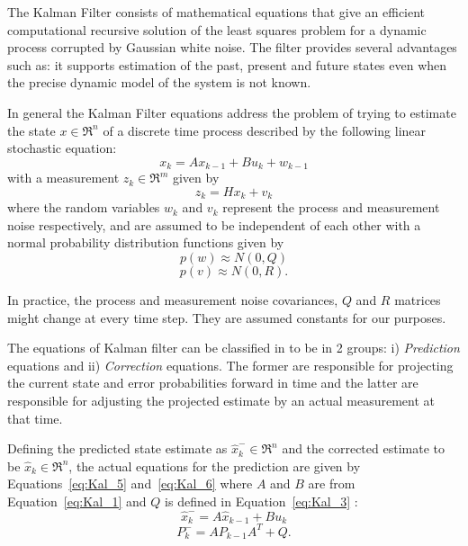 The Kalman Filter \cite{Kalman1960, WelchandBishop1995} consists of mathematical equations that give an efficient computational recursive solution of the least squares problem for a dynamic process corrupted by Gaussian white noise. The filter provides several advantages such as: it supports estimation of the past, present and future states even when the precise dynamic model of the system is not known.

In general the Kalman Filter equations address the problem of trying to estimate the state $ x \in \Re^n $ of a discrete time process described by the following linear stochastic equation:
\begin{equation}
\label{eq:Kal_1}
x_k = Ax_{k-1} + Bu_k + w_{k-1}
\end{equation}
with a measurement $ z_k \in \Re^m $ given by
\begin{equation}
\label{eq:Kal_2}
z_k=Hx_k+v_k
\end{equation}
where the random variables $ w_k $ and $ v_k$ represent the process and measurement noise respectively, and are assumed to be independent of each other with a normal probability distribution functions given by
\begin{equation}
\label{eq:Kal_3}
p(w)\approx N(0,Q)
\end{equation} 
\begin{equation}
\label{eq:Kal_4}
p(v) \approx N(0,R).
\end{equation}

In practice, the process and measurement noise covariances, $ Q $ and $ R $ matrices might change at every time step. They are assumed constants for our purposes. 

The equations of Kalman filter can be classified in to be in 2 groups: i) \textit{Prediction} equations and ii) \textit{Correction} equations. The former are responsible for projecting the current state and error probabilities forward in time and the latter are responsible for adjusting the projected estimate by an actual measurement at that time. 

Defining the predicted state estimate as $ \hat{x}^-_k \in \Re^n $ and the corrected estimate to be $ \hat{x}_k \in \Re^n $, the actual equations for the prediction are given by Equations~\ref{eq:Kal_5} and~\ref{eq:Kal_6} where $ A $ and $ B $ are from Equation~\ref{eq:Kal_1} and $ Q $ is defined in Equation~\ref{eq:Kal_3} \cite{WelchandBishop1995}:
\begin{equation}
\label{eq:Kal_5}
\hat{x}^-_k = A\hat{x}_{k-1}+Bu_k
\end{equation}
\begin{equation}
\label{eq:Kal_6}
P^-_k = AP_{k-1}A^T+Q.
\end{equation}

